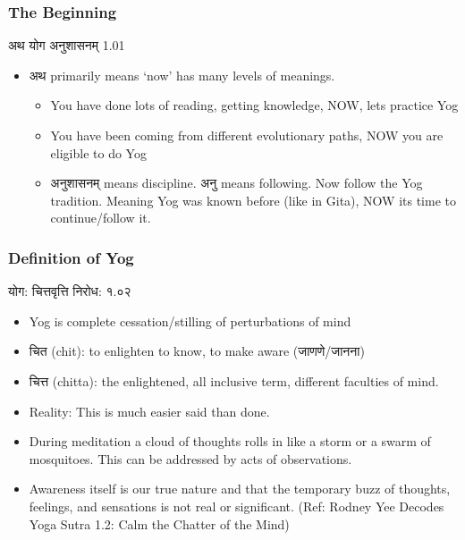 \begin{frame}[fragile]\frametitle{The Beginning}

अथ योग अनुशासनम् 1.01

	\begin{itemize}
	\item अथ primarily means `now' has many levels of meanings.
	\begin{itemize}
	\item You have done lots of reading, getting knowledge, NOW, lets practice Yog
	\item You have been coming from different evolutionary paths, NOW you are eligible to do Yog
	\item अनुशासनम् means discipline. अनु means following. Now follow the Yog tradition. Meaning Yog was known before (like in Gita), NOW its time to continue/follow it.
	\end{itemize}	
	\end{itemize}

\end{frame}


\begin{frame}[fragile]\frametitle{Definition of Yog}

योग: चित्तवृत्ति निरोध: १.०२

	\begin{itemize}
	\item Yog is complete cessation/stilling of perturbations of mind
	\item चित (chit): to enlighten to know, to make aware (जाणणे/जानना)
	\item चित्त (chitta): the enlightened, all inclusive term, different faculties of mind.
	\item Reality: This is much easier said than done. 
	\item During meditation a cloud of thoughts rolls in like a storm or a swarm of mosquitoes. This can be addressed by acts of observations. \item Awareness itself is our true nature and that the temporary buzz of thoughts, feelings, and sensations is not real or significant. ({\tiny Ref: Rodney Yee Decodes Yoga Sutra 1.2: Calm the Chatter of the Mind})
	\end{itemize}

\end{frame}


